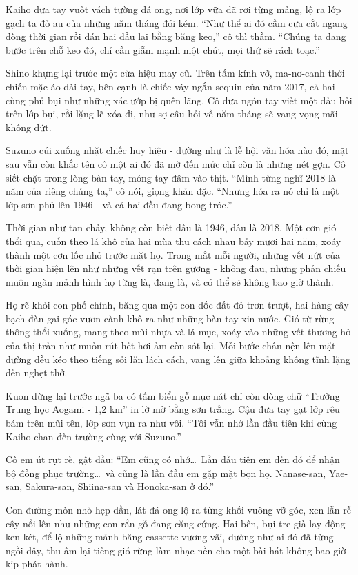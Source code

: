 \documentclass[../main.tex]{subfiles}
\begin{document}
Kaiho đưa tay vuốt vách tường đá ong, nơi lớp vữa đã rơi từng mảng, lộ ra lớp gạch ta đỏ au của những năm tháng đói kém. ``Như thể ai đó cầm cưa cắt ngang dòng thời gian rồi dán hai đầu lại bằng băng keo,'' cô thì thầm. ``Chúng ta đang bước trên chỗ keo đó, chỉ cần giẫm mạnh một chút, mọi thứ sẽ rách toạc.''

Shino khựng lại trước một cửa hiệu may cũ. Trên tấm kính vỡ, ma-nơ-canh thời chiến mặc áo dài tay, bên cạnh là chiếc váy ngắn sequin của năm 2017, cả hai cùng phủ bụi như những xác ướp bị quên lãng. Cô đưa ngón tay viết một dấu hỏi trên lớp bụi, rồi lặng lẽ xóa đi, như sợ câu hỏi về năm tháng sẽ vang vọng mãi không dứt.

Suzuno cúi xuống nhặt chiếc huy hiệu - dường như là lễ hội văn hóa nào đó, mặt sau vẫn còn khắc tên cô một ai đó đã mờ đến mức chỉ còn là những nét gợn. Cô siết chặt trong lòng bàn tay, móng tay đâm vào thịt. ``Mình từng nghĩ 2018 là năm của riêng chúng ta,'' cô nói, giọng khản đặc. ``Nhưng hóa ra nó chỉ là một lớp sơn phủ lên 1946 - và cả hai đều đang bong tróc.''

Thời gian như tan chảy, không còn biết đâu là 1946, đâu là 2018. Một cơn gió thổi qua, cuốn theo lá khô của hai mùa thu cách nhau bảy mươi hai năm, xoáy thành một cơn lốc nhỏ trước mặt họ. Trong mắt mỗi người, những vết nứt của thời gian hiện lên như những vết rạn trên gương - không đau, nhưng phản chiếu muôn ngàn mảnh hình họ từng là, đang là, và có thể sẽ không bao giờ thành.

\ct

Họ rẽ khỏi con phố chính, băng qua một con dốc đất đỏ trơn trượt, hai hàng cây bạch đàn gai góc vươn cành khô ra như những bàn tay xin nước. Gió từ rừng thông thổi xuống, mang theo mùi nhựa và lá mục, xoáy vào những vết thương hở của thị trấn như muốn rút hết hơi ấm còn sót lại. Mỗi bước chân nện lên mặt đường đều kéo theo tiếng sỏi lăn lách cách, vang lên giữa khoảng không tĩnh lặng đến nghẹt thở.

Kuon dừng lại trước ngã ba có tấm biển gỗ mục nát chỉ còn dòng chữ ``Trường Trung học Aogami - 1,2 km'' in lờ mờ bằng sơn trắng. Cậu đưa tay gạt lớp rêu bám trên mũi tên, lớp sơn vụn ra như vôi. ``Tôi vẫn nhớ lần đầu tiên khi cùng Kaiho-chan đến trường cùng với Suzuno.''

Cô em út rụt rè, gật đầu: ``Em cũng có nhớ\dots\ Lần đầu tiên em đến đó để nhận bộ đồng phục trường\dots\ và cũng là lần đầu em gặp mặt bọn họ. Nanase-san, Yae-san, Sakura-san, Shiina-san và Honoka-san ở đó.''

Con đường mòn nhỏ hẹp dần, lát đá ong lộ ra từng khối vuông vỡ góc, xen lẫn rễ cây nổi lên như những con rắn gỗ đang căng cứng. Hai bên, bụi tre già lay động ken két, để lộ những mảnh băng cassette vương vãi, dường như ai đó đã từng ngồi đây, thu âm lại tiếng gió rừng làm nhạc nền cho một bài hát không bao giờ kịp phát hành.
\end{document}
